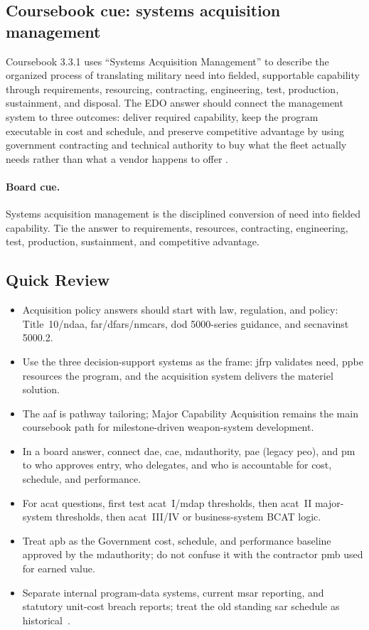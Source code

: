 \documentclass[../main.tex]{subfiles}
\begin{document}
\subsection{Coursebook cue: systems acquisition management}

Coursebook 3.3.1 uses ``Systems Acquisition Management'' to describe the
organized process of translating military need into fielded, supportable
capability through requirements, resourcing, contracting, engineering, test,
production, sustainment, and disposal.  The EDO answer should connect the
management system to three outcomes: deliver required capability, keep the
program executable in cost and schedule, and preserve competitive advantage by
using government contracting and technical authority to buy what the fleet
actually needs rather than what a vendor happens to offer
\autocite{edo-3-3-1-acq-policy-players-2025}.

\paragraph{Board cue.}
Systems acquisition management is the disciplined conversion of need into
fielded capability.  Tie the answer to requirements, resources, contracting,
engineering, test, production, sustainment, and competitive advantage.

\subsection{Quick Review}
\begin{itemize}
  \item Acquisition policy answers should start with law, regulation, and policy: Title~10/\ac{ndaa}, \ac{far}/\ac{dfars}/\ac{nmcars}, \ac{dod} 5000-series guidance, and \ac{secnavinst} 5000.2.
  \item Use the three decision-support systems as the frame: \ac{jfrp} validates need, \ac{ppbe} resources the program, and the acquisition system delivers the materiel solution.
  \item The \ac{aaf} is pathway tailoring; Major Capability Acquisition remains the main coursebook path for milestone-driven weapon-system development.
  \item In a board answer, connect \ac{dae}, \ac{cae}, \ac{mdauthority}, \ac{pae} (legacy \ac{peo}), and \ac{pm} to who approves entry, who delegates, and who is accountable for cost, schedule, and performance.
  \item For \ac{acat} questions, first test \ac{acat}~I/\ac{mdap} thresholds, then \ac{acat}~II major-system thresholds, then \ac{acat}~III/IV or business-system BCAT logic.
  \item Treat \ac{apb} as the Government cost, schedule, and performance baseline approved by the \ac{mdauthority}; do not confuse it with the contractor \ac{pmb} used for earned value.
  \item Separate internal program-data systems, current \ac{msar} reporting, and statutory unit-cost breach reports; treat the old standing \ac{sar} schedule as historical~\autocite{USC-10-4351,DOD-MSAR-Transition-2023,USC-10-4374}.
\end{itemize}
\end{document}
